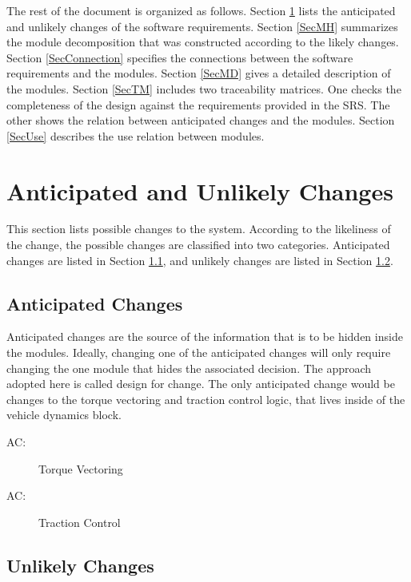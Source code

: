 \documentclass[12pt, titlepage]{article}
\newcounter{acnum}
\newcommand{\actheacnum}{AC\theacnum}
\begin{document}
The rest of the document is organized as follows. Section
\ref{SecChange} lists the anticipated and unlikely changes of the software
requirements. Section \ref{SecMH} summarizes the module decomposition that
was constructed according to the likely changes. Section \ref{SecConnection}
specifies the connections between the software requirements and the
modules. Section \ref{SecMD} gives a detailed description of the
modules. Section \ref{SecTM} includes two traceability matrices. One checks
the completeness of the design against the requirements provided in the SRS. The
other shows the relation between anticipated changes and the modules. Section
\ref{SecUse} describes the use relation between modules.

\section{Anticipated and Unlikely Changes} \label{SecChange}

This section lists possible changes to the system. According to the likeliness
of the change, the possible changes are classified into two
categories. Anticipated changes are listed in Section \ref{SecAchange}, and
unlikely changes are listed in Section \ref{SecUchange}.

\subsection{Anticipated Changes} \label{SecAchange}

Anticipated changes are the source of the information that is to be hidden
inside the modules. Ideally, changing one of the anticipated changes will only
require changing the one module that hides the associated decision. The approach
adopted here is called design for change. The only anticipated change would be changes to the 
torque vectoring and traction control logic, that lives inside of the vehicle dynamics block.

\begin{description}
\item[ \actheacnum \label{acTV}:] Torque Vectoring
\item[ \actheacnum \label{acTC}:] Traction Control
\end{description}


\subsection{Unlikely Changes} \label{SecUchange}
\end{document}
